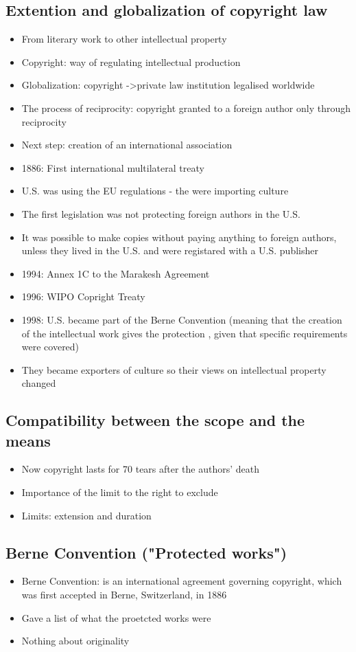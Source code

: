 \documentclass{article}
\begin{document}
\subsection{Extention and globalization of copyright law}
\begin{itemize}
\item From literary work to other intellectual property 
\item Copyright: way of regulating intellectual production 
\item Globalization: copyright ->private law institution legalised worldwide 
\item The process of reciprocity: copyright granted to a foreign author only through reciprocity 
\item Next step: creation of an international association 
\item 1886: First international multilateral treaty 
\item U.S. was using the EU regulations  - the were importing culture 
\item The first legislation was not protecting foreign authors in the U.S.
\item It was possible to make copies without paying anything to foreign authors, unless they lived in the U.S. and were registared with a U.S. publisher
\item 1994: Annex 1C to the Marakesh Agreement 
\item 1996: WIPO Copright Treaty 
\item 1998: U.S. became part of the Berne Convention (meaning that the creation of the intellectual work gives the protection , given that specific requirements were covered)
\item They became exporters of culture so their views on intellectual property changed 
\end{itemize}

\subsection{Compatibility between the scope and the means}
\begin{itemize}
\item Now copyright lasts for 70 tears after the authors' death 
\item Importance of the limit to the right to exclude
\item Limits: extension and duration
\end{itemize}

\subsection{Berne Convention ("Protected works")}
\begin{itemize}
\item Berne Convention: is an international agreement governing copyright, which was first accepted in Berne, Switzerland, in 1886
\item Gave a list of what the proetcted works were
\item Nothing about originality 
\end{itemize}
\end{document}
